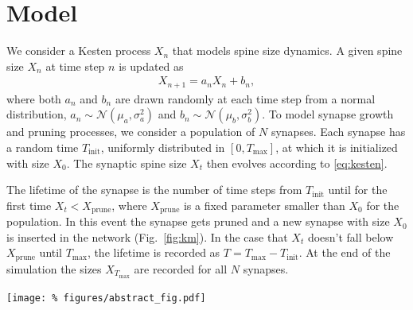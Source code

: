 
\vspace{-0.4cm}
\section*{Model}

We consider a Kesten process $X_n$ that models spine size dynamics. A given spine size $X_n$ at time step $n$ is updated as
%
\begin{align}
  X_{n+1} = a_n X_n + b_n, \label{eq:kesten}
\end{align}
%
where both $a_n$ and $b_n$ are drawn randomly at each time step from a normal distribution, $a_n \sim \mathcal{N}(\mu_a, \sigma_a^2)$ and $b_n \sim \mathcal{N}(\mu_b, \sigma_b^2)$. To model synapse growth and pruning processes, we consider a population of $N$ synapses. Each synapse has a random time $T_{\mathrm{init}}$, uniformly distributed in $[0,T_{\text{max}}]$, at which it is initialized with size $X_0$. The synaptic spine size $X_t$ then evolves according to \eqref{eq:kesten}.

\medskip

The lifetime of the synapse is the number of time steps from $T_{\text{init}}$ until for the first time $X_t < X_{\mathrm{prune}}$, where $X_{\mathrm{prune}}$ is a fixed parameter smaller than $X_0$ for the population. In this event the synapse gets pruned and a new synapse with size $X_0$ is inserted in the network (Fig.~\ref{fig:km}). In the case that $X_t$ doesn't fall below $X_{\mathrm{prune}}$ until $T_{\text{max}}$, the lifetime is recorded as $T=T_{\text{max}}-T_{\text{init}}$. At the end of the simulation the sizes $X_{T_{\text{max}}}$ are recorded for all $N$ synapses.

\begin{center}\vspace{1cm}
  \texttt{[image: \%
    figures/abstract\_fig.pdf]}
  \label{fig:km}
\end{center}\vspace{1.4cm}
